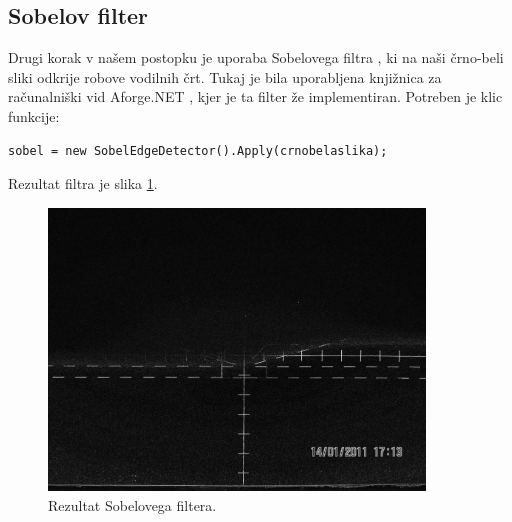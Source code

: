 \documentclass[oneside, a4paper, 12pt]{book}
\begin{document}
\subsection{Sobelov filter}
\label{ch:sobel}
Drugi korak v našem postopku je uporaba Sobelovega filtra \cite{sobel-wiki}, ki na naši črno-beli sliki odkrije robove vodilnih črt. Tukaj je bila uporabljena knjižnica za računalniški vid Aforge.NET \cite{sobel}, kjer je ta filter že implementiran. Potreben je klic funkcije:
\begin{samepage}
\begin{verbatim}
sobel = new SobelEdgeDetector().Apply(crnobelaslika);
\end{verbatim}
\end{samepage}
Rezultat filtra je slika \ref{pic:sobel}.

\begin{figure}
\begin{center}
\includegraphics[width=10cm]{slike/sobel.jpg}
\end{center}
\caption{Rezultat Sobelovega filtera.}
\label{pic:sobel}
\end{figure}
\end{document}
